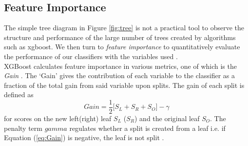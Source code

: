 \subsection{Feature Importance}
\label{sec:importance}

The simple tree diagram in Figure \ref{fig:tree} is not a practical tool to observe the structure and performance of the large number of trees created by algorithms such as xgboost. We then turn to \textit{feature importance} to quantitatively evaluate the performance of our classifiers with the variables used \cite{james2013introduction}. \\

XGBoost calculates feature importance in various metrics, one of which is the \textit{Gain} \cite{xgboost}. The `Gain' gives the contribution of each variable to the classifier as a fraction of the total gain from said variable upon splits. The gain of each split is defined as
\begin{equation}
    Gain = \frac{1}{2}\Bigg[ S_L + S_R + S_O \Bigg] -\gamma
    \label{eq:Gain}
\end{equation}
for scores on the new left(right) leaf $S_L$ ($S_R$) and the original leaf $S_O$. The penalty term $gamma$ regulates whether a split is created from a leaf i.e. if Equation (\ref{eq:Gain}) is negative, the leaf is not split \cite{xgboost_documentation}. 